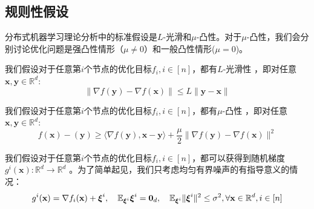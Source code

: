 \subsection{规则性假设}

分布式机器学习理论分析中的标准假设是$L$-光滑和$\mu$-凸性。对于$\mu$-凸性，我们会分别讨论优化问题是强凸性情形（$\mu \neq 0$）和一般凸性情形($\mu = 0$)。

\begin{assumption}
我们假设对于任意第$i$个节点的优化目标$f_i,i \in [n]$，都有$L$-光滑性 \cite{stich2018sparsified}，即对任意$\textbf{x},\textbf{y} \in \mathbb{R}^d$:
\begin{equation}
\lVert \nabla f(\textbf{y}) - \nabla f(\textbf{x}) \rVert \leq L\lVert \textbf{y} - \textbf{x} \rVert \nonumber
\end{equation}
\label{assumption:1}
\end{assumption}

\begin{assumption}
我们假设对于任意第$i$个节点的优化目标$f_i,i \in [n]$，都有$\mu$-凸性 \cite{stich2018sparsified}，即对任意$\textbf{x},\textbf{y} \in \mathbb{R}^d$:
\begin{equation}
f(\textbf{x}) - (\textbf{y}) \geq  \langle \nabla f(\textbf{y}),\textbf{x}-\textbf{y} \rangle + \frac{\mu}{2} \lVert \nabla f(\textbf{y}) - \nabla f(\textbf{x}) \rVert^2 \nonumber
\end{equation}
\label{assumption:2}
\end{assumption}


\begin{assumption}
我们假设对于任意第$i$个节点的优化目标$f_i,i \in [n]$，都可以获得到随机梯度 $g^i(\textbf{x}): \mathbb{R}^d \rightarrow  \mathbb{R}^d$ \cite{stich2019error}。为了简单起见，我们只考虑均匀有界噪声的有指导意义的情况：
\begin{equation}
g^i(\textbf{x})=\nabla f_i(\textbf{x})+\boldsymbol{\xi} ^i,
\quad \mathbb{E}_{\boldsymbol{\xi} ^i}\boldsymbol{\xi} ^i = \textbf{0}_d, \quad \mathbb{E}_{\boldsymbol{\xi} ^ i} \lVert \boldsymbol{\xi} ^i \rVert^2 \leq \sigma^2, 
\quad \\
\forall \textbf{x} \in \mathbb{R}^d, \nonumber
i \in [n]
\end{equation}
\label{assumption:3}
\end{assumption}


